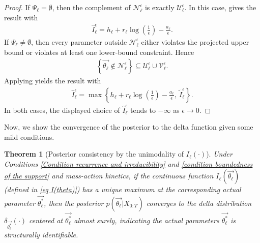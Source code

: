 \documentclass[pdflatex,sn-mathphys-num]{sn-jnl}%
\theoremstyle{thmstyleone}%
\newtheorem{theorem}{Theorem}%
\theoremstyle{thmstyletwo}%
\theoremstyle{thmstylethree}%
\begin{document}
\begin{appendices}
\begin{proof}
    If $\Psi_\ell=\emptyset$, then the complement of $\mathcal N_\ell^\epsilon$ is exactly $\mathcal U_\ell^\epsilon$.
    In this case,  gives the result with
    \begin{align*}
        \hat I^{\epsilon}_\ell
        =h_\ell+r_\ell\log\left(\frac{1}{\epsilon}\right)-\frac{a_\ell}{\epsilon}.
    \end{align*}
    If $\Psi_\ell\neq\emptyset$, then every parameter outside $\mathcal N_\ell^\epsilon$ either violates the projected upper bound or violates at least one lower-bound constraint. Hence
    \begin{align*}
        \left\{\overrightarrow{\theta_\ell}\notin\mathcal N_\ell^\epsilon\right\}
        \subseteq
        \mathcal U_\ell^\epsilon\cup\mathcal V_\ell^\epsilon.
    \end{align*}
    Applying  yields the result with
    \begin{align*}
        \hat I^{\epsilon}_\ell
        =\max\left\{
        h_\ell+r_\ell\log\left(\frac{1}{\epsilon}\right)-\frac{a_\ell}{\epsilon},~
        \tilde I_\ell^\epsilon
        \right\}.
    \end{align*}
    In both cases, the displayed choice of $\hat I^{\epsilon}_\ell$ tends to $-\infty$ as $\epsilon\to0$.
\end{proof}


Now, we show the convergence of the posterior to the delta function given some mild conditions.


\begin{theorem}[Posterior consistency by the unimodality of $I_\ell(\cdot)$]\label{thm structural identifiability based on I}
     Under Conditions \ref{Condition recurrence and irreducibility} and \ref{condition boundedness of the support} and mass-action kinetics,
    if the continuous function $I_\ell\left(\overrightarrow{\theta_\ell}\right)$ (defined in \eqref{eq I(theta)}) has a unique maximum at the corresponding actual parameter $\overrightarrow{\theta^*_\ell}$,  then the posterior $p\left(\overrightarrow{\theta_\ell} \big|X_{0:T}\right) $ converges to the delta distribution $\delta_{\overrightarrow{\theta^*_\ell}}(\cdot)$ centered at $\overrightarrow{\theta^*_\ell}$ almost surely, indicating the actual parameters $\overrightarrow{\theta^*_\ell}$ is structurally identifiable. 
\end{theorem}


\end{appendices}
\end{document}
